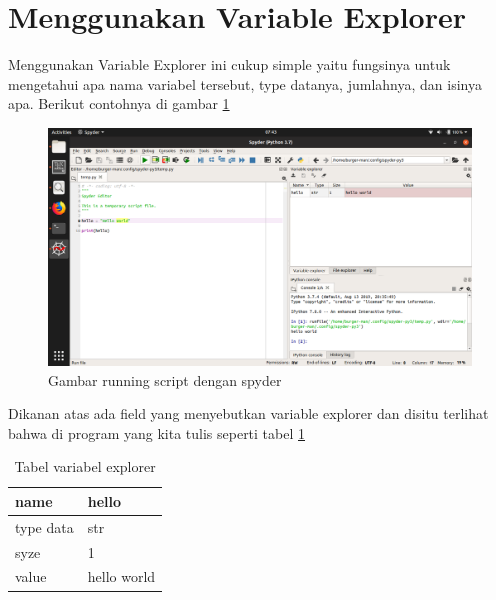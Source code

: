 \section{Menggunakan Variable Explorer}
Menggunakan Variable Explorer ini cukup simple yaitu fungsinya untuk mengetahui apa nama variabel tersebut, type datanya, jumlahnya, dan isinya apa. Berikut contohnya di gambar \ref{variabel}
\begin{figure}[H]
\centering
\includegraphics[width=1\textwidth]{figures/helloworld.png}
\caption{Gambar running script dengan spyder}
\label{variabel}
\end{figure}

Dikanan atas ada field yang menyebutkan variable explorer dan disitu terlihat bahwa di program yang kita tulis seperti tabel \ref{vexplorer}
\begin{table}[H]
\centering
\begin{tabular}{|l|l|}
\hline
name      & hello       \\ \hline
type data & str         \\ \hline
syze      & 1           \\ \hline
value     & hello world \\ \hline
\end{tabular}
\caption{Tabel variabel explorer}
\label{vexplorer}
\end{table}

